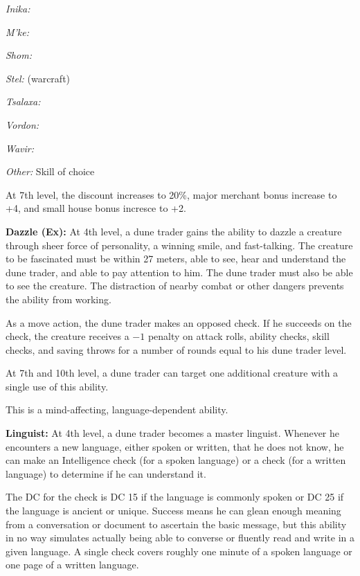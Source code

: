 {\textit{Inika:} 

\textit{M'ke:} 

\textit{Shom:} 

\textit{Stel:}  (warcraft)

\textit{Tsalaxa:} 

\textit{Vordon:} 

\textit{Wavir:} 

\textit{Other:} Skill of choice

At 7th level, the discount increases to 20\%, major merchant bonus increase to +4, and small house bonus incresce to +2.

\textbf{Dazzle (Ex):} At 4th level, a dune trader gains the ability to dazzle a creature through sheer force of personality, a winning smile, and fast-talking. The creature to be fascinated must be within 27 meters, able to see, hear and understand the dune trader, and able to pay attention to him. The dune trader must also be able to see the creature. The distraction of nearby combat or other dangers prevents the ability from working.

As a move action, the dune trader makes an opposed  check. If he succeeds on the check, the creature receives a $-1$ penalty on attack rolls, ability checks, skill checks, and saving throws for a number of rounds equal to his dune trader level.

At 7th and 10th level, a dune trader can target one additional creature with a single use of this ability.

This is a mind-affecting, language-dependent ability.

\textbf{Linguist:} At 4th level, a dune trader becomes a master linguist. Whenever he encounters a new language, either spoken or written, that he does not know, he can make an Intelligence check (for a spoken language) or a  check (for a written language) to determine if he can understand it.

The DC for the check is DC 15 if the language is commonly spoken or DC 25 if the language is ancient or unique. Success means he can glean enough meaning from a conversation or document to ascertain the basic message, but this ability in no way simulates actually being able to converse or fluently read and write in a given language. A single check covers roughly one minute of a spoken language or one page of a written language.

}
